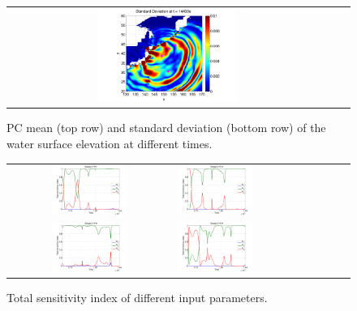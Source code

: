 \begin{figure}[h]
\begin{tabular}{ccc}
\hspace*{-65pt}
\includegraphics[width=0.45\textwidth]{./figures/sigma2d4.pdf}
\end{tabular}
\caption{PC mean (top row) and standard deviation (bottom row) of the water surface elevation at different times.}
\label{fig:mean2d}
\end{figure}

\begin{figure}[h]
\begin{tabular}{clc}
\includegraphics[width=0.475\textwidth]{./figures/sens1.pdf} &
\includegraphics[width=0.475\textwidth]{./figures/sens2.pdf} \\
\includegraphics[width=0.475\textwidth]{./figures/sens3.pdf} &
\includegraphics[width=0.475\textwidth]{./figures/sens4.pdf}
\end{tabular}
\caption{Total sensitivity index of different input parameters.}
\label{fig:sens}
\end{figure}


